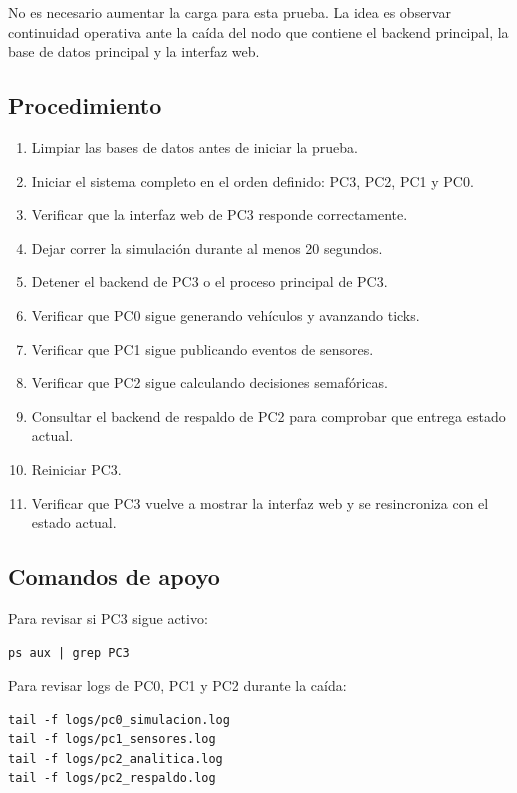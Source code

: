 \documentclass[12pt, a4paper]{article}
\begin{document}
No es necesario aumentar la carga para esta prueba. La idea es observar continuidad operativa ante la caída del nodo que contiene el backend principal, la base de datos principal y la interfaz web.

\subsection{Procedimiento}

\begin{enumerate}
    \item Limpiar las bases de datos antes de iniciar la prueba.
    \item Iniciar el sistema completo en el orden definido: PC3, PC2, PC1 y PC0.
    \item Verificar que la interfaz web de PC3 responde correctamente.
    \item Dejar correr la simulación durante al menos 20 segundos.
    \item Detener el backend de PC3 o el proceso principal de PC3.
    \item Verificar que PC0 sigue generando vehículos y avanzando ticks.
    \item Verificar que PC1 sigue publicando eventos de sensores.
    \item Verificar que PC2 sigue calculando decisiones semafóricas.
    \item Consultar el backend de respaldo de PC2 para comprobar que entrega estado actual.
    \item Reiniciar PC3.
    \item Verificar que PC3 vuelve a mostrar la interfaz web y se resincroniza con el estado actual.
\end{enumerate}

\subsection{Comandos de apoyo}

Para revisar si PC3 sigue activo:

\begin{verbatim}
ps aux | grep PC3
\end{verbatim}

Para revisar logs de PC0, PC1 y PC2 durante la caída:

\begin{verbatim}
tail -f logs/pc0_simulacion.log
tail -f logs/pc1_sensores.log
tail -f logs/pc2_analitica.log
tail -f logs/pc2_respaldo.log
\end{verbatim}
\end{document}
